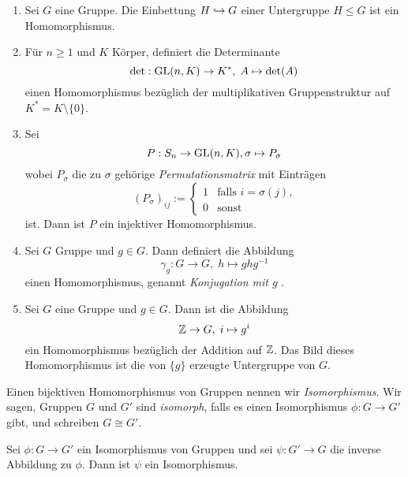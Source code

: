 \documentclass{book}
\begin{document}
\begin{exas}
    \label{exas:homs}
    \begin{enumerate}
        \item Sei $G$ eine Gruppe. Die Einbettung $H \hookrightarrow G$ einer Untergruppe
            $H \le G$ ist ein Homomorphismus.
        \item Für $n \ge 1$ und $K$ Körper, definiert die Determinante 
            \[
                \det: \operatorname{GL}(n,K) \to K^*,\; A \mapsto \det(A)
            \]
            einen Homomorphismus bezüglich der multiplikativen Gruppenstruktur auf $K^* = K \setminus \{0\}$. 
        \item\label{exas:hom:P} Sei 
            \[
                P: S_n \to \operatorname{GL}(n,K), \sigma \mapsto P_{\sigma}
            \]
            wobei $P_\sigma$ die zu $\sigma$ gehörige {\em Permutationsmatrix} mit Einträgen
            \[
                (P_{\sigma})_{ij} := 
                \begin{cases} 
                    1 & \text{falls $i = \sigma(j)$,}\\
                    0 & \text{sonst}
                \end{cases}
            \]
            ist. Dann ist $P$ ein injektiver Homomorphismus. 
        \item Sei $G$ Gruppe und $g \in G$. Dann definiert die Abbildung
            \[
                \gamma_g: G \to G,\; h \mapsto ghg^{-1}
            \]
            einen Homomorphismus, genannt {\em Konjugation mit $g$} .
        \item Sei $G$ eine Gruppe und $g \in G$. Dann ist die Abbildung
            \[
                \mathbb{Z} \to G, \; i \mapsto g^i
            \]
            ein Homomorphismus bezüglich der Addition auf $\mathbb{Z}$. Das Bild
            dieses Homomorphismus ist die von $\{g\}$ erzeugte Untergruppe von
            $G$. 
    \end{enumerate}
\end{exas}

\begin{term}
    \label{term:iso}
    Einen bijektiven Homomorphismus von Gruppen nennen wir {\em Isomorphismus}.
    Wir sagen, Gruppen $G$ und $G'$ sind {\em isomorph}, falls es einen
    Isomorphismus $\phi: G \to G'$ gibt, und schreiben $G \cong G'$. 
\end{term}

\begin{prob}
    \label{prob:iso}
    Sei $\phi: G \to G'$ ein Isomorphismus von Gruppen und sei $\psi: G' \to G$
    die inverse Abbildung zu $\phi$. Dann ist $\psi$ ein Isomorphismus.
\end{prob}
\end{document}
